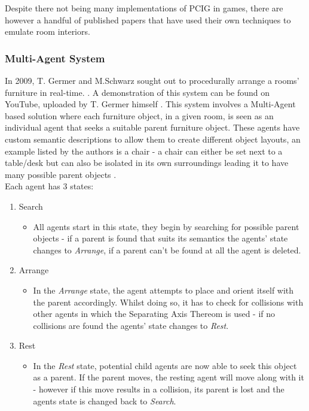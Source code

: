 Despite there not being many implementations of PCIG in games, there are however a handful of published papers that have used their own techniques to emulate room interiors.
\subsubsection*{Multi-Agent System}
In 2009, T. Germer and M.Schwarz sought out to procedurally arrange a rooms' furniture in real-time. \cite{real-time-walkthroughs}. A demonstration of this system can be found on YouTube, uploaded by T. Germer himself \cite{youtube:real-time-walkthroughs}. This system involves a Multi-Agent based solution where each furniture object, in a given room, is seen as an individual agent that seeks a suitable parent furniture object. These agents have custom semantic descriptions to allow them to create different object layouts, an example listed by the authors is a chair - a chair can either be set next to a table/desk but can also be isolated in its own surroundings leading it to have many possible parent objects \cite{real-time-walkthroughs}.\\
Each agent has 3 states:
\begin{enumerate}
    \item Search
        \begin{itemize}
            \item All agents start in this state, they begin by searching for possible parent objects - if a parent is found that suits its semantics the agents' state changes to \textit{Arrange}, if a parent can't be found at all the agent is deleted.
        \end{itemize}
    \item Arrange
        \begin{itemize}
            \item In the \textit{Arrange} state, the agent attempts to place and orient itself with the parent accordingly. Whilst doing so, it has to check for collisions with other agents in which the Separating Axis Thereom is used \cite{separating-axis-thereom} - if no collisions are found the agents' state changes to \textit{Rest}.
        \end{itemize}
    \item Rest
        \begin{itemize}
            \item In the \textit{Rest} state, potential child agents are now able to seek this object as a parent. If the parent moves, the resting agent will move along with it - however if this move results in a collision, its parent is lost and the agents state is changed back to \textit{Search}.
        \end{itemize}
\end{enumerate}
